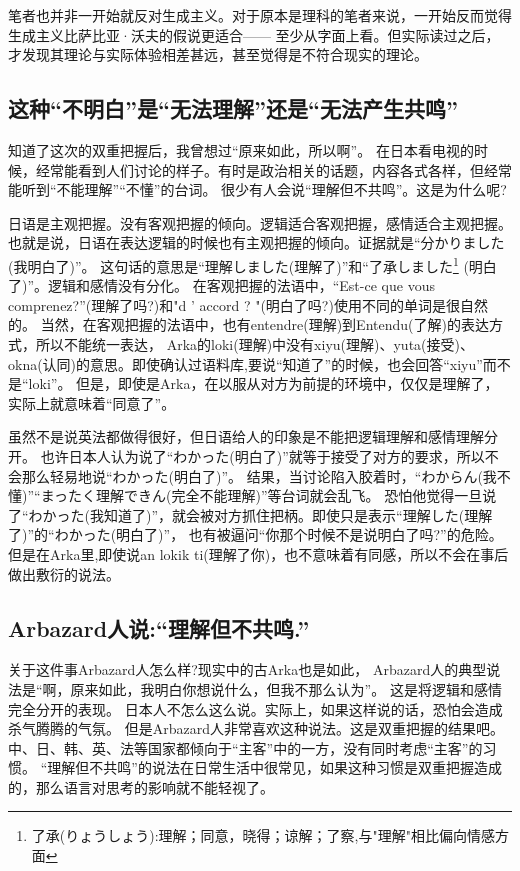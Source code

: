 笔者也并非一开始就反对生成主义。对于原本是理科的笔者来说，一开始反而觉得生成主义比萨比亚·沃夫的假说更适合——
至少从字面上看。但实际读过之后，才发现其理论与实际体验相差甚远，甚至觉得是不符合现实的理论。
\subsection{这种``不明白''是``无法理解''还是``无法产生共鸣''}

知道了这次的双重把握后，我曾想过“原来如此，所以啊”。
在日本看电视的时候，经常能看到人们讨论的样子。有时是政治相关的话题，内容各式各样，但经常能听到“不能理解”“不懂”的台词。
很少有人会说“理解但不共鸣”。这是为什么呢?

日语是主观把握。没有客观把握的倾向。逻辑适合客观把握，感情适合主观把握。
也就是说，日语在表达逻辑的时候也有主观把握的倾向。证据就是“分かりました(我明白了)”。
这句话的意思是“理解しました(理解了)”和“了承しました\footnote{了承(りょうしょう):理解；同意，晓得；谅解；了察,与"理解"相比偏向情感方面}
(明白了)”。逻辑和感情没有分化。
在客观把握的法语中，“Est-ce que vous comprenez?”(理解了吗?)和"d ' accord ? "(明白了吗?)使用不同的单词是很自然的。
当然，在客观把握的法语中，也有entendre(理解)到Entendu(了解)的表达方式，所以不能统一表达，
Arka的loki(理解)中没有xiyu(理解)、yuta(接受)、okna(认同)的意思。即使确认过语料库,要说“知道了”的时候，也会回答“xiyu”而不是“loki”。
但是，即使是Arka，在以服从对方为前提的环境中，仅仅是理解了，实际上就意味着“同意了”。

虽然不是说英法都做得很好，但日语给人的印象是不能把逻辑理解和感情理解分开。
也许日本人认为说了“わかった(明白了)”就等于接受了对方的要求，所以不会那么轻易地说“わかった(明白了)”。
结果，当讨论陷入胶着时，“わからん(我不懂)”“まったく理解できん(完全不能理解)”等台词就会乱飞。
恐怕他觉得一旦说了“わかった(我知道了)”，就会被对方抓住把柄。即使只是表示“理解した(理解了)”的“わかった(明白了)”，
也有被逼问“你那个时候不是说明白了吗?”的危险。
但是在Arka里,即使说an lokik ti(理解了你)，也不意味着有同感，所以不会在事后做出敷衍的说法。
\subsection{Arbazard人说:``理解但不共鸣.''}
关于这件事Arbazard人怎么样?现实中的古Arka也是如此，
Arbazard人的典型说法是“啊，原来如此，我明白你想说什么，但我不那么认为”。
这是将逻辑和感情完全分开的表现。
日本人不怎么这么说。实际上，如果这样说的话，恐怕会造成杀气腾腾的气氛。
但是Arbazard人非常喜欢这种说法。这是双重把握的结果吧。
中、日、韩、英、法等国家都倾向于“主客”中的一方，没有同时考虑“主客”的习惯。
“理解但不共鸣”的说法在日常生活中很常见，如果这种习惯是双重把握造成的，那么语言对思考的影响就不能轻视了。

